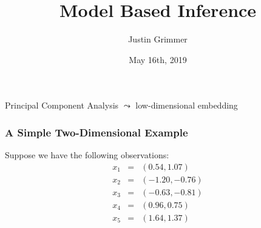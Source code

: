 \documentclass{beamer}
\title[Model Based Inference] %
{Model Based Inference}
\author{Justin Grimmer}
\institute[Stanford University]{Professor\\Department of Political Science \\  Stanford University}
\date{May 16th, 2019}%
\numberwithin{equation}{section}
\begin{document}
\begin{frame}
\titlepage
\end{frame}











\begin{frame}

\huge

Principal Component Analysis $\leadsto$ low-dimensional embedding

\end{frame}



\begin{frame}
\frametitle{A Simple Two-Dimensional Example}

Suppose we have the following observations:
\begin{eqnarray}
x_{1} & = & (0.54, 1.07) \nonumber \\
x_{2} & = & (-1.20, -0.76) \nonumber \\
x_{3} & = & (-0.63, -0.81)\nonumber \\
x_{4} & = & (0.96, 0.75) \nonumber \\
x_{5} & = & (1.64, 1.37) \nonumber
\end{eqnarray}


\end{frame}



\begin{frame}
\begin{center}


\end{center}
\end{frame}
\end{document}
